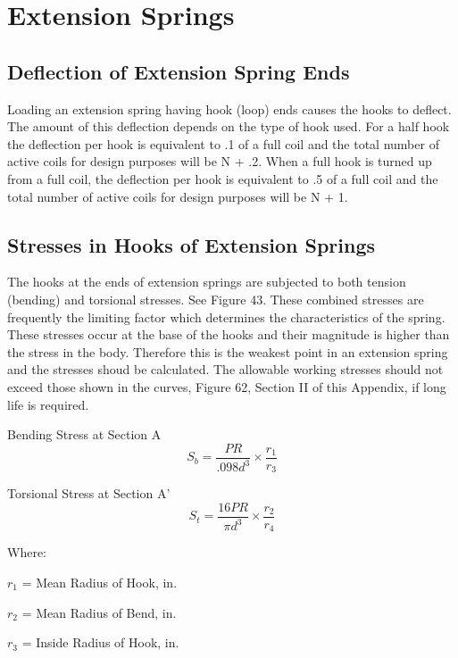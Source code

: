 \documentclass[10pt]{article}
\begin{document}
\section{Extension Springs}  %
\subsection{Deflection of Extension Spring Ends} %
Loading an extension spring having hook (loop) ends causes the hooks to deflect.
The amount of this deflection depends on the type of hook used. 
For a half hook the deflection per hook is equivalent to .1 of a full coil and the total number of active coils for design purposes will be N + .2.
When a full hook is turned up from a full coil, the deflection per hook is equivalent to .5 of a full coil and the total number of active coils for design purposes will be N + 1.







\subsection{Stresses in Hooks of Extension Springs} %
The hooks at the ends of extension springs are subjected to both tension (bending) and torsional stresses. 
See Figure 43. 
These combined stresses are frequently the limiting factor which determines the characteristics of the spring. 
These stresses occur at the base of the hooks and their magnitude is higher than the stress in the body. 
Therefore this is the weakest point in an extension spring and the stresses shoud be calculated. 
The allowable working stresses should not exceed those shown in the curves, Figure 62, Section II of this Appendix, if long life is required.

Bending Stress at Section A
$$ S_b = \frac{PR}{.098 d^3} \times \frac{r_1}{r_3} $$

Torsional Stress at Section A'
$$ S_t = \frac{16 P R}{\pi d^3}  \times \frac{r_2}{r_4} $$

Where:

$r_1$ = Mean Radius of Hook, in.

$r_2$ = Mean Radius of Bend, in.

$r_3$ = Inside Radius of Hook, in.
\end{document}
